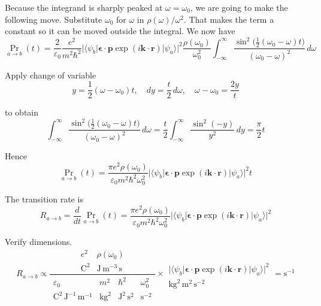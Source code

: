 Because the integrand is sharply peaked at $\omega=\omega_0$,
we are going to make the following move.
Substitute $\omega_0$ for $\omega$ in $\rho(\omega)/\omega^2$.
That makes the term a constant so it can be moved outside the integral.
We now have
\begin{equation*}
\Pr_{a\rightarrow b}(t)
=\frac{2}{\varepsilon_0}
\frac{e^2}{m^2\hbar^2}
\bigl|\langle\psi_b|\boldsymbol{\epsilon}\cdot\mathbf p\exp(i\mathbf k\cdot\mathbf r)|\psi_a\rangle\bigr|^2
\frac{\rho(\omega_0)}{\omega_0^2}
\int_{-\infty}^\infty
\frac{\sin^2\bigl(\tfrac{1}{2}(\omega_0-\omega)t\bigr)}{(\omega_0-\omega)^2}\,d\omega
\end{equation*}

Apply change of variable
\begin{equation*}
y=\frac{1}{2}(\omega-\omega_0)t,\quad
dy=\frac{t}{2}\,d\omega,\quad
\omega-\omega_0=\frac{2y}{t}
\end{equation*}

to obtain
\begin{equation*}
\int_{-\infty}^\infty
\frac{\sin^2\bigl(\tfrac{1}{2}(\omega_0-\omega)t\bigr)}{(\omega_0-\omega)^2}\,d\omega
=\frac{t}{2}\int_{-\infty}^\infty\frac{\sin^2(-y)}{y^2}\,dy
=\frac{\pi}{2}t
\end{equation*}

Hence
\begin{equation*}
\Pr_{a\rightarrow b}(t)
=\frac{\pi e^2\rho(\omega_0)}{\varepsilon_0m^2\hbar^2\omega_0^2}
\bigl|\langle\psi_b|\boldsymbol{\epsilon}\cdot\mathbf p\exp(i\mathbf k\cdot\mathbf r)|\psi_a\rangle\bigr|^2
t
\end{equation*}

The transition rate is
\begin{equation*}
R_{a\rightarrow b}=\frac{d}{dt}\Pr_{a\rightarrow b}(t)
=\frac{\pi e^2\rho(\omega_0)}{\varepsilon_0m^2\hbar^2\omega_0^2}
\bigl|\langle\psi_b|\boldsymbol{\epsilon}\cdot\mathbf p\exp(i\mathbf k\cdot\mathbf r)|\psi_a\rangle\bigr|^2
\end{equation*}

Verify dimensions.
\begin{equation*}
R_{a\rightarrow b}\propto
\frac{\begin{matrix}
e^2 & \rho(\omega_0)
\\
\text{C}^2 & \text{J}\,\text{m}^{-3}\,\text{s}
\end{matrix}
}{\begin{matrix}
\varepsilon_0 & m^2 & \hbar^2 & \omega_0^2
\\
\text{C}^2\,\text{J}^{-1}\,\text{m}^{-1}
& \text{kg}^2 & \text{J}^2\,\text{s}^2 & \text{s}^{-2}
\end{matrix}}
\times
\begin{matrix}
\\
\bigl|\langle\psi_b|\boldsymbol{\epsilon}\cdot\mathbf p\exp(i\mathbf k\cdot\mathbf r)|\psi_a\rangle\bigr|^2
\\
\text{kg}^2\,\text{m}^2\,\text{s}^{-2}
\end{matrix}
=\text{s}^{-1}
\end{equation*}


